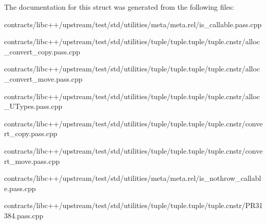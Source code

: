 The documentation for this struct was generated from the following files\+:\begin{DoxyCompactItemize}
\item 
contracts/libc++/upstream/test/std/utilities/meta/meta.\+rel/is\+\_\+callable.\+pass.\+cpp\item 
contracts/libc++/upstream/test/std/utilities/tuple/tuple.\+tuple/tuple.\+cnstr/alloc\+\_\+convert\+\_\+copy.\+pass.\+cpp\item 
contracts/libc++/upstream/test/std/utilities/tuple/tuple.\+tuple/tuple.\+cnstr/alloc\+\_\+convert\+\_\+move.\+pass.\+cpp\item 
contracts/libc++/upstream/test/std/utilities/tuple/tuple.\+tuple/tuple.\+cnstr/alloc\+\_\+\+U\+Types.\+pass.\+cpp\item 
contracts/libc++/upstream/test/std/utilities/tuple/tuple.\+tuple/tuple.\+cnstr/convert\+\_\+copy.\+pass.\+cpp\item 
contracts/libc++/upstream/test/std/utilities/tuple/tuple.\+tuple/tuple.\+cnstr/convert\+\_\+move.\+pass.\+cpp\item 
contracts/libc++/upstream/test/std/utilities/meta/meta.\+rel/is\+\_\+nothrow\+\_\+callable.\+pass.\+cpp\item 
contracts/libc++/upstream/test/std/utilities/tuple/tuple.\+tuple/tuple.\+cnstr/P\+R31384.\+pass.\+cpp\end{DoxyCompactItemize}
